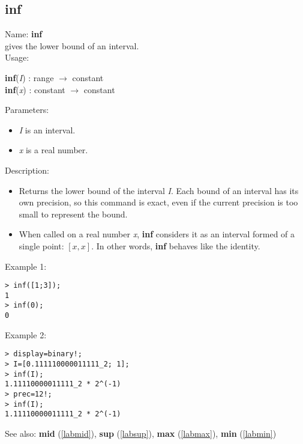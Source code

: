 \subsection{inf}
\label{labinf}
\noindent Name: \textbf{inf}\\
gives the lower bound of an interval.\\
\noindent Usage: 
\begin{center}
\textbf{inf}(\emph{I}) : \textsf{range} $\rightarrow$ \textsf{constant}\\
\textbf{inf}(\emph{x}) : \textsf{constant} $\rightarrow$ \textsf{constant}\\
\end{center}
Parameters: 
\begin{itemize}
\item \emph{I} is an interval.
\item \emph{x} is a real number.
\end{itemize}
\noindent Description: \begin{itemize}

\item Returns the lower bound of the interval \emph{I}. Each bound of an interval has its 
   own precision, so this command is exact, even if the current precision is too 
   small to represent the bound.

\item When called on a real number \emph{x}, \textbf{inf} considers it as an interval formed
   of a single point: $\left[ x, x \right]$. In other words, \textbf{inf} behaves like the identity.
\end{itemize}
\noindent Example 1: 
\begin{center}\begin{minipage}{15cm}\begin{Verbatim}[frame=single]
> inf([1;3]);
1
> inf(0);
0
\end{Verbatim}
\end{minipage}\end{center}
\noindent Example 2: 
\begin{center}\begin{minipage}{15cm}\begin{Verbatim}[frame=single]
> display=binary!;
> I=[0.111110000011111_2; 1];
> inf(I);
1.11110000011111_2 * 2^(-1)
> prec=12!;
> inf(I);
1.11110000011111_2 * 2^(-1)
\end{Verbatim}
\end{minipage}\end{center}
See also: \textbf{mid} (\ref{labmid}), \textbf{sup} (\ref{labsup}), \textbf{max} (\ref{labmax}), \textbf{min} (\ref{labmin})
